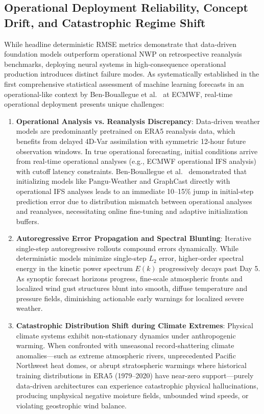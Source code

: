 \subsection{Operational Deployment Reliability, Concept Drift, and Catastrophic Regime Shift}
\label{sec:operational_reliability}
While headline deterministic RMSE metrics demonstrate that data-driven foundation models outperform operational NWP on retrospective reanalysis benchmarks, deploying neural systems in high-consequence operational production introduces distinct failure modes. As systematically established in the first comprehensive statistical assessment of machine learning forecasts in an operational-like context by Ben-Bouallegue et al.~\cite{benbouallegue2024rise} at ECMWF, real-time operational deployment presents unique challenges:
\begin{enumerate}
    \item \textbf{Operational Analysis vs. Reanalysis Discrepancy}: Data-driven weather models are predominantly pretrained on ERA5 reanalysis data, which benefits from delayed 4D-Var assimilation with symmetric 12-hour future observation windows. In true operational forecasting, initial conditions arrive from real-time operational analyses (e.g., ECMWF operational IFS analysis) with cutoff latency constraints. Ben-Bouallegue et al.~\cite{benbouallegue2024rise} demonstrated that initializing models like Pangu-Weather and GraphCast directly with operational IFS analyses leads to an immediate 10--15\% jump in initial-step prediction error due to distribution mismatch between operational analyses and reanalyses, necessitating online fine-tuning and adaptive initialization buffers.
    \item \textbf{Autoregressive Error Propagation and Spectral Blunting}: Iterative single-step autoregressive rollouts compound errors dynamically. While deterministic models minimize single-step $L_2$ error, higher-order spectral energy in the kinetic power spectrum $E(k)$ progressively decays past Day 5. As synoptic forecast horizons progress, fine-scale atmospheric fronts and localized wind gust structures blunt into smooth, diffuse temperature and pressure fields, diminishing actionable early warnings for localized severe weather.
    \item \textbf{Catastrophic Distribution Shift during Climate Extremes}: Physical climate systems exhibit non-stationary dynamics under anthropogenic warming. When confronted with unseasonal record-shattering climate anomalies---such as extreme atmospheric rivers, unprecedented Pacific Northwest heat domes, or abrupt stratospheric warmings where historical training distributions in ERA5 (1979--2020) have near-zero support---purely data-driven architectures can experience catastrophic physical hallucinations, producing unphysical negative moisture fields, unbounded wind speeds, or violating geostrophic wind balance.

\end{enumerate}
